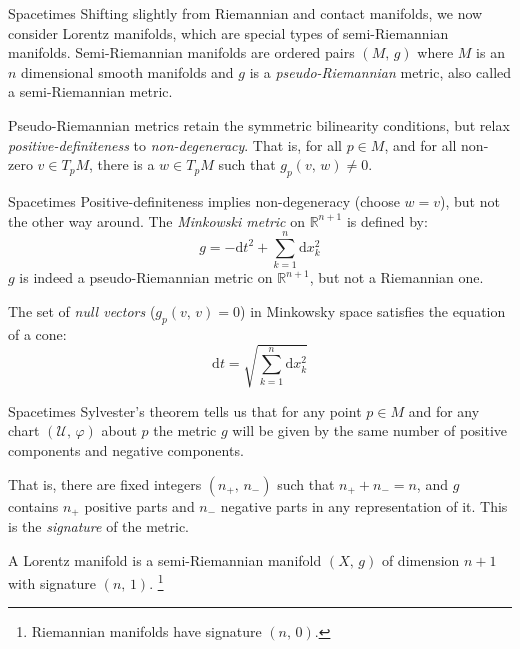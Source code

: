 \documentclass{beamer}
\begin{document}
    \begin{frame}{Spacetimes}
        Shifting slightly from Riemannian and contact manifolds, we now consider
        Lorentz manifolds, which are special types of semi-Riemannian manifolds.
        Semi-Riemannian manifolds are ordered pairs $(M,\,g)$ where $M$ is an
        $n$ dimensional smooth manifolds and $g$ is a
        \textit{pseudo-Riemannian} metric, also called a semi-Riemannian metric.
        \par\hfill\par
        Pseudo-Riemannian metrics retain the symmetric bilinearity conditions,
        but relax \textit{positive-definiteness} to \textit{non-degeneracy}.
        That is, for all $p\in{M}$, and for all non-zero $v\in{T}_{p}M$, there
        is a $w\in{T}_{p}M$ such that $g_{p}(v,\,w)\ne{0}$.
    \end{frame}
    \begin{frame}{Spacetimes}
        Positive-definiteness implies non-degeneracy (choose $w=v$), but not
        the other way around. The \textit{Minkowski metric} on
        $\mathbb{R}^{n+1}$ is defined by:
        \begin{equation}
            g=-\textrm{d}t^{2}+\sum_{k=1}^{n}\textrm{d}x_{k}^{2}
        \end{equation}
        $g$ is indeed a pseudo-Riemannian metric on $\mathbb{R}^{n+1}$, but not
        a Riemannian one.
        \par\hfill\par
        The set of \textit{null vectors} ($g_{p}(v,\,v)=0$) in Minkowsky space
        satisfies the equation of a cone:
        \begin{equation}
            \textrm{d}t=\sqrt{\sum_{k=1}^{n}\textrm{d}x_{k}^{2}}
        \end{equation}
    \end{frame}
    \begin{frame}{Spacetimes}
        Sylvester's theorem tells us that for any point $p\in{M}$ and for any
        chart $(\mathcal{U},\,\varphi)$ about $p$ the metric $g$ will be given
        by the same number of positive components and negative components.
        \par\hfill\par
        That is, there are fixed integers $(n_{+},\,n_{-})$ such that
        $n_{+}+n_{-}=n$, and $g$ contains $n_{+}$ positive parts and $n_{-}$
        negative parts in any representation of it. This is the
        \textit{signature} of the metric.
        \par\hfill\par
        A Lorentz manifold is a
        semi-Riemannian manifold $(X,\,g)$ of dimension $n+1$
        with signature $(n,\,1)$.%
        \footnote{%
            Riemannian manifolds have signature $(n,\,0)$.
        }
    \end{frame}
\end{document}
